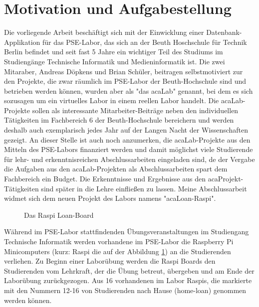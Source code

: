 \section{Motivation und Aufgabestellung}
\label{sec:intro:motivation}
Die vorliegende Arbeit beschäftigt sich mit der Einwicklung einer Datenbank-Applikation für das PSE-Labor\cite{website:17}, das sich an der Beuth Hoschschule für Technik Berlin befindet und seit fast 5 Jahre ein wichtiger Teil des Studiums im Studiengänge Technische Informatik und Medieninformatik ist. Die zwei Mitaraber, Andreas Döpkens und Brian Schüler, beitragen selbstmotiviert zur den  Projekte, die zwar räumlich im PSE-Labor der Beuth-Hochschule sind und betrieben werden können\cite{website:1}, wurden aber als "das acaLab" genannt, bei dem es sich sozusagen um ein virtuelles Labor in einem reellen Labor handelt. Die acaLab-Projekte sollen als interessante Mitarbeiter-Beiträge neben den individuellen Tätigkeiten im Fachbereich 6 der Beuth-Hochschule bereichern und werden deshalb auch exemplarisch jedes Jahr auf der Langen Nacht der Wissenschaften gezeigt\cite{website:1}. An dieser Stelle ist auch noch anzumerken, die acaLab-Projekte aus den Mitteln des PSE-Labors finanziert werden und damit möglichst viele Studierende für lehr- und erkenntnisreichen Abschlussarbeiten eingeladen sind, de der Vergabe die Aufgaben aus den acaLab-Projekten als Abschlussarbeiten spart dem Fachbereich ein Budget. Die Erkenntnisse und Ergebnisse aus den acaProjekt-Tätigkeiten sind später in die Lehre einfließen zu lassen.\cite{website:1} Meine Abschlussarbeit widmet sich dem neuen Projekt des Labors namens "acaLoan-Raspi".

\begin{figure}
	\caption{Das Raspi Loan-Board }
	\label{fig:raspiLab}
\end{figure}
Während im PSE-Labor stattfindenden Übungsveranstaltungen im Studiengang Technische Informatik werden vorhandene im PSE-Labor die Raspberry Pi Minicomputers (kurz: Raspi die auf der Abbildung \ref{fig:raspiLab})  an die Studierenden verliehen. Zu Beginn einer Laborübung werden die Raspi Boards den Studierenden vom Lehrkraft, der die Übung betreut, übergeben und am Ende der Laborübung zurückgezogen. Aus 16 vorhandenen im Labor Raspis, die markierte mit den Nummern 12-16 von Studierenden nach Hause (home-loan) genommen werden können.\cite{website:1} 


